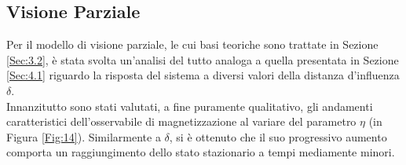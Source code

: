\documentclass[letterpaper,10pt]{article}
\begin{document}
\subsection{Visione Parziale}
\label{Sec:4.3}

Per il modello di visione parziale, le cui basi teoriche sono trattate in Sezione \ref{Sec:3.2}, è stata svolta un'analisi del tutto analoga a quella presentata in Sezione \ref{Sec:4.1} riguardo la risposta del sistema a diversi valori della distanza d'influenza $\delta$.
\\ Innanzitutto sono stati valutati, a fine puramente qualitativo, gli andamenti caratteristici dell'osservabile di magnetizzazione al variare del parametro $\eta$ (in Figura \ref{Fig:14}). Similarmente a $\delta$, si è ottenuto che il suo progressivo aumento comporta un raggiungimento dello stato stazionario a tempi mediamente minori.
\end{document}
